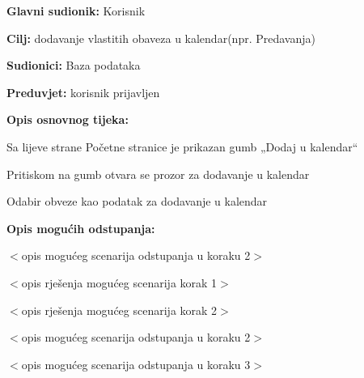 					\noindent {}
					\begin{packed_item}
	
						\item \textbf{Glavni sudionik: }Korisnik
						\item  \textbf{Cilj:} dodavanje vlastitih obaveza u kalendar(npr. Predavanja)
						\item  \textbf{Sudionici:}
						Baza podataka
						\item  \textbf{Preduvjet:} korisnik prijavljen
						\item  \textbf{Opis osnovnog tijeka:}
						
						\item[] \begin{packed_enum}
	
							\item 	Sa lijeve strane Početne stranice je prikazan gumb „Dodaj u kalendar“
							\item	Pritiskom na gumb otvara  se prozor za dodavanje u kalendar
							\item	Odabir obveze kao podatak za dodavanje u kalendar
							
							
						\end{packed_enum}
						
						\item  \textbf{Opis mogućih odstupanja:}
						
						\item[] \begin{packed_item}
	
							\item[2.a] $<$opis mogućeg scenarija odstupanja u koraku 2$>$
							\item[] \begin{packed_enum}
								
								\item $<$opis rješenja mogućeg scenarija korak 1$>$
								\item $<$opis rješenja mogućeg scenarija korak 2$>$
								
							\end{packed_enum}
							\item[2.b] $<$opis mogućeg scenarija odstupanja u koraku 2$>$
							\item[3.a] $<$opis mogućeg scenarija odstupanja  u koraku 3$>$
							
						\end{packed_item}
					\end{packed_item}
				
